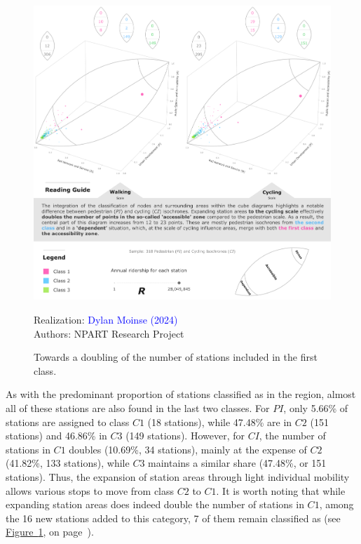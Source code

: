 \begin{refsegment}
\begin{figure}[h!]\vspace*{4pt}
    \caption{Towards a doubling of the number of stations included in the first class.}
    \label{fig-chap6:cubes-classification}
    \centerline{\includegraphics[width=1\columnwidth]{src/Figures/Chap-6/EN_NPART_Cubes_Classification.pdf}}
    \vspace{5pt}
    \begin{flushright}\scriptsize{
    Realization: \textcolor{blue}{Dylan Moinse (2024)}
    \\
    Authors: \acrshort{NPART} Research Project
    }\end{flushright}
\end{figure}

As with the predominant proportion of stations classified as  in the region, almost all of these stations are also found in the last two classes. For \(PI\), only 5.66\% of stations are assigned to class \(C1\) (18 stations), while 47.48\% are in \(C2\) (151 stations) and 46.86\% in \(C3\) (149 stations). However, for \(CI\), the number of stations in \(C1\) doubles (10.69\%, 34 stations), mainly at the expense of \(C2\) (41.82\%, 133 stations), while \(C3\) maintains a similar share (47.48\%, or 151 stations). Thus, the expansion of station areas through light individual mobility allows various stops to move from class \(C2\) to \(C1\). It is worth noting that while expanding station areas does indeed double the number of stations in \(C1\), among the 16 new stations added to this category, 7 of them remain classified as  (see \hyperref[fig-chap6:cubes-classification]{Figure~\ref{fig-chap6:cubes-classification}}, on page~\pageref{fig-chap6:cubes-classification}).%


\end{refsegment}
